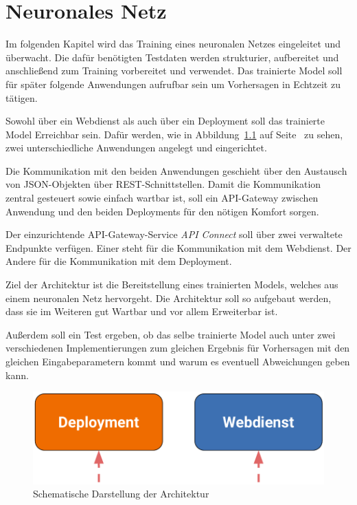 \chapter{Neuronales Netz}
\label{ch:neuronalesNetz}
Im folgenden Kapitel wird das Training eines neuronalen Netzes eingeleitet und überwacht. Die dafür benötigten Testdaten
werden strukturier, aufbereitet und anschließend zum Training vorbereitet und verwendet. Das trainierte Model soll für
später folgende Anwendungen aufrufbar sein um Vorhersagen in Echtzeit zu tätigen.

Sowohl über ein Webdienst als auch über ein Deployment soll das trainierte Model Erreichbar sein. Dafür werden, wie in
Abbildung~\ref{fig:schematische_architektur} auf Seite~\pageref{fig:schematische_architektur} zu sehen, zwei
unterschiedliche Anwendungen angelegt und eingerichtet.

Die Kommunikation mit den beiden Anwendungen geschieht über den Austausch von JSON-Objekten über REST-Schnittstellen.
Damit die Kommunikation zentral gesteuert sowie einfach wartbar ist, soll ein API-Gateway zwischen Anwendung und den
beiden Deployments für den nötigen Komfort sorgen.

Der einzurichtende API-Gateway-Service \textit{API Connect} soll über zwei verwaltete Endpunkte verfügen. Einer steht
für die Kommunikation mit dem Webdienst. Der Andere für die Kommunikation mit dem Deployment.

Ziel der Architektur ist die Bereitstellung eines trainierten Models, welches aus einem neuronalen Netz hervorgeht. Die
Architektur soll so aufgebaut werden, dass sie im Weiteren gut Wartbar und vor allem Erweiterbar ist.

Außerdem soll ein Test ergeben, ob das selbe trainierte Model auch unter zwei verschiedenen Implementierungen zum
gleichen Ergebnis für Vorhersagen mit den gleichen Eingabeparametern kommt und warum es eventuell Abweichungen geben
kann.\\

\begin{figure}[h]
    \centering
    \includegraphics[scale=0.5]{images/kapitel_3/architektur_schematisch.pdf}
    \caption{Schematische Darstellung der Architektur}
    \label{fig:schematische_architektur}
\end{figure}